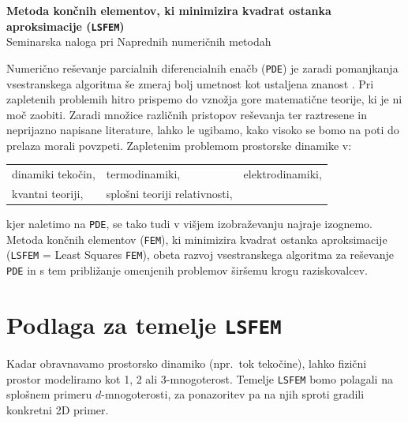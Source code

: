\begin{center}
	\textbf{\LARGE{Metoda končnih elementov, ki minimizira kvadrat ostanka aproksimacije (\texttt{LSFEM})}}\\[0.25cm]
	\large{Seminarska naloga pri Naprednih numeričnih metodah}\\[0.7cm]
\end{center}

Numerično reševanje parcialnih diferencialnih enačb (\texttt{PDE}) je zaradi pomanjkanja vsestranskega algoritma še zmeraj bolj umetnost kot ustaljena znanost \cite{JiangB-LSFEM}. Pri zapletenih problemih hitro prispemo do vznožja gore matematične teorije, ki je ni moč zaobiti. Zaradi množice različnih pristopov reševanja ter raztresene in neprijazno napisane literature, lahko le ugibamo, kako visoko se bomo na poti do prelaza morali povzpeti. Zapletenim problemom prostorske dinamike v:
\begin{center}
	\begin{tabular}[h]{lll}
		\tabitem dinamiki tekočin,\hspace{1cm}	&	\tabitem termodinamiki,\hspace{2.5cm}	&	\tabitem elektrodinamiki,\\
		\tabitem kvantni teoriji,	&	\tabitem splošni teoriji relativnosti,&	\\
	\end{tabular}
\end{center}
kjer naletimo na \texttt{PDE}, se tako tudi v višjem izobraževanju najraje izognemo. Metoda končnih elementov (\texttt{FEM}), ki minimizira kvadrat ostanka aproksimacije (\texttt{LSFEM} = Least Squares \texttt{FEM}), obeta razvoj vsestranskega algoritma za reševanje \texttt{PDE} in s tem približanje omenjenih problemov širšemu krogu raziskovalcev.

\section{Podlaga za temelje \texttt{LSFEM}}
Kadar obravnavamo prostorsko dinamiko (npr.\ tok tekočine), lahko fizični prostor modeliramo kot 1, 2 ali 3-mnogoterost. Temelje \texttt{LSFEM} bomo polagali na splošnem primeru $d$-mnogoterosti, za ponazoritev pa na njih sproti gradili konkretni 2D primer.

